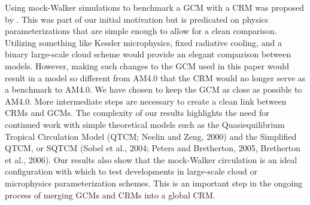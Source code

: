 \documentclass[draft]{agujournal2019}
\begin{document}
{Using mock-Walker simulations to benchmark a GCM with a CRM was proposed by .
This was part of our initial motivation but is predicated on physics parameterizations that are simple enough 
to allow for a clean comparison. 
Utilizing something like Kessler microphysics, 
fixed radiative cooling, and a binary large-scale cloud scheme would provide an elegant comparison between 
models.  However, making such changes to the GCM used in this paper would result in a model so different from AM4.0 
that the CRM would no longer serve as a benchmark to AM4.0.   We have chosen to keep the GCM as close as 
possible to AM4.0.
More intermediate steps are necessary to create a clean link between CRMs and GCMs.  
The complexity of our results highlights the need for continued work with simple theoretical models such as the 
Quasiequilibrium Tropical Circulation Model (QTCM; Neelin and Zeng, 2000) and the Simplified QTCM, or SQTCM 
(Sobel et al., 2004; Peters and Bretherton, 2005, Bretherton et al., 2006).  
Our results also show that the mock-Walker circulation is an ideal configuration with which to test developments in 
large-scale cloud or microphysics parameterization schemes.  
This is an important step in the ongoing process of merging GCMs and CRMs into a global CRM.   


}
\end{document}
